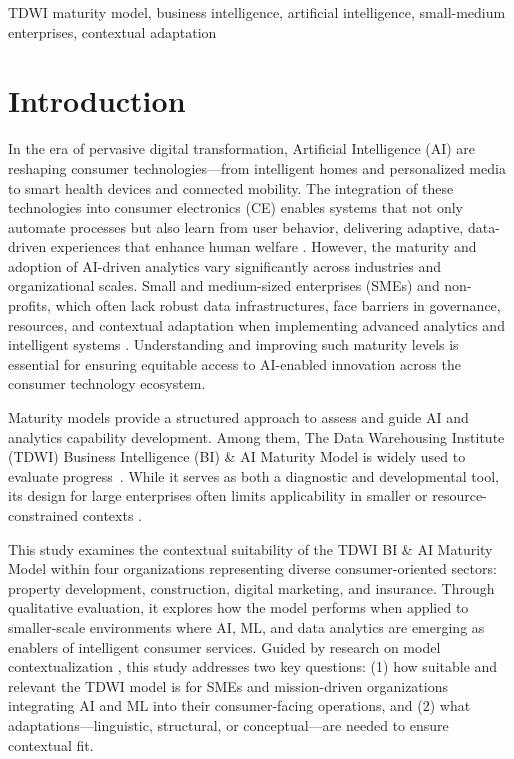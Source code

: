 \documentclass[conference]{IEEEtran}
\begin{document}
\begin{IEEEkeywords}
TDWI maturity model, business intelligence, artificial intelligence, small-medium enterprises, contextual adaptation
\end{IEEEkeywords}




\section{Introduction}

In the era of pervasive digital transformation, Artificial Intelligence (AI) are reshaping consumer technologies—from intelligent homes and personalized media to smart health devices and connected mobility. The integration of these technologies into consumer electronics (CE) enables systems that not only automate processes but also learn from user behavior, delivering adaptive, data-driven experiences that enhance human welfare \cite{chen2012business, davenport2007competing}.  
However, the maturity and adoption of AI-driven analytics vary significantly across industries and organizational scales. Small and medium-sized enterprises (SMEs) and non-profits, which often lack robust data infrastructures, face barriers in governance, resources, and contextual adaptation when implementing advanced analytics and intelligent systems \cite{popovic2012towards, llave2019review}. Understanding and improving such maturity levels is essential for ensuring equitable access to AI-enabled innovation across the consumer technology ecosystem.

Maturity models provide a structured approach to assess and guide AI and analytics capability development. Among them, The Data Warehousing Institute (TDWI) Business Intelligence (BI) \& AI Maturity Model is widely used to evaluate progress~\cite{halper2025tdwi}. While it serves as both a diagnostic and developmental tool, its design for large enterprises often limits applicability in smaller or resource-constrained contexts \cite{becker2009developing, schuster2021maturity}.

This study examines the contextual suitability of the TDWI BI \& AI Maturity Model within four organizations representing diverse consumer-oriented sectors: property development, construction, digital marketing, and insurance. Through qualitative evaluation, it explores how the model performs when applied to smaller-scale environments where AI, ML, and data analytics are emerging as enablers of intelligent consumer services. Guided by research on model contextualization \cite{becker2009developing, holtzblatt2015contextual}, this study addresses two key questions: (1) how suitable and relevant the TDWI model is for SMEs and mission-driven organizations integrating AI and ML into their consumer-facing operations, and (2) what adaptations—linguistic, structural, or conceptual—are needed to ensure contextual fit.  
\end{document}
